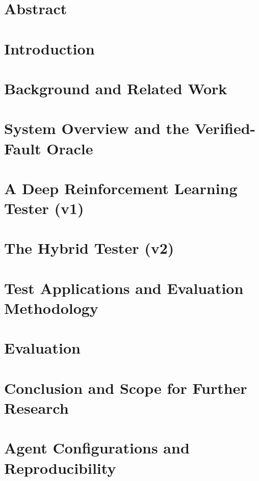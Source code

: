 \documentclass[a4paper, 12pt]{report}
\theoremstyle{definition}
\begin{document}
\chapter*{Abstract}


\clearpage
{}
\setcounter{page}{1}
\chapter{Introduction}

\chapter{Background and Related Work}

\chapter{System Overview and the Verified-Fault Oracle}

\chapter{A Deep Reinforcement Learning Tester (v1)}

\chapter{The Hybrid Tester (v2)}

\chapter{Test Applications and Evaluation Methodology}

\chapter{Evaluation}

\chapter{Conclusion and Scope for Further Research}

\appendix
\chapter{Agent Configurations and Reproducibility}


\newpage
\renewcommand{\bibname}{References}


\end{document}

